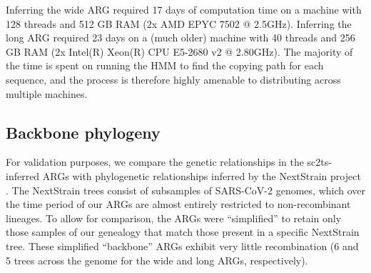 \documentclass{article}
\begin{document}
Inferring the wide ARG required 17 days of computation time on a machine with
128 threads and 512 GB RAM (2x AMD EPYC 7502 @ 2.5GHz). Inferring the long ARG
required 23 days on a (much older) machine with 40 threads and 256 GB RAM (2x
Intel(R) Xeon(R) CPU E5-2680 v2 @ 2.80GHz). The majority of the time is spent
on running the HMM to find the copying path for each sequence, and the process
is therefore highly amenable to distributing across multiple machines.

\subsection{Backbone phylogeny}
For validation purposes, we compare the genetic
relationships in the sc2ts-inferred ARGs with phylogenetic relationships
inferred by the NextStrain project \citep{Hadfield2018-ef}. The NextStrain
trees consist of subsamples of SARS-CoV-2 genomes, which over the time period
of our ARGs are almost entirely restricted to non-recombinant lineages. To
allow for comparison, the ARGs were ``simplified'' \citep{Kelleher2018-xc} to
retain only those samples of our genealogy that match those present in a
specific NextStrain tree. These simplified ``backbone'' ARGs exhibit very
little recombination (6 and 5 trees across the genome for the wide and long
ARGs, respectively).
\end{document}
